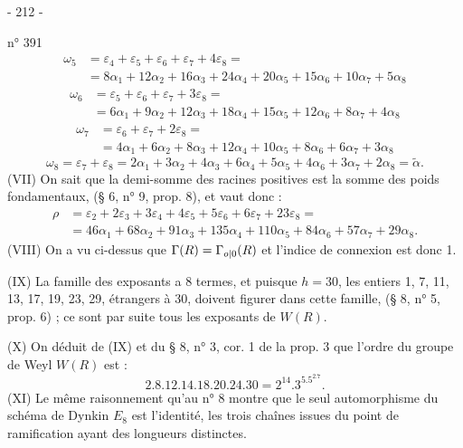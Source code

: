 \begin{center}- 212 -\end{center}
\hfill n° 391
\[
\begin{split}
\omega_5&=\varepsilon_4+\varepsilon_5+\varepsilon_6+\varepsilon_7+4\varepsilon_8=\\
&=8\alpha_1+12\alpha_2+16\alpha_3+24\alpha_4+20\alpha_5+15\alpha_6+10\alpha_7+5\alpha_8
\end{split}
\]
\[
\begin{split}
\omega_6&=\varepsilon_5+\varepsilon_6+\varepsilon_7+3\varepsilon_8=\\
&=6\alpha_1+9\alpha_2+12\alpha_3+18\alpha_4+15\alpha_5+12\alpha_6+8\alpha_7+4\alpha_8
\end{split}
\]
\[
\begin{split}
\omega_7&=\varepsilon_6+\varepsilon_7+2\varepsilon_8=\\
&=4\alpha_1+6\alpha_2+8\alpha_3+12\alpha_4+10\alpha_5+8\alpha_6+6\alpha_7+3\alpha_8
\end{split}
\]
\[
\omega_8=\varepsilon_7+\varepsilon_8=2\alpha_1+3\alpha_2+4\alpha_3+6\alpha_4+5\alpha_5+4\alpha_6+3\alpha_7+2\alpha_8=\widetilde\alpha.
\]
(VII) On sait que la demi-somme des racines positives est la somme des poids fondamentaux, (§ 6, n° 9, prop. 8), et vaut donc :
\[
\begin{split}
\rho&=\varepsilon_2+2\varepsilon_3+3\varepsilon_4+4\varepsilon_5+5\varepsilon_6+6\varepsilon_7+23\varepsilon_8=\\
&=46\alpha_1+68\alpha_2+91\alpha_3+135\alpha_4+110\alpha_5+84\alpha_6+57\alpha_7+29\alpha_8.
\end{split}
\]
(VIII) On a vu ci-dessus que $\Gamma(R)=\Gamma_{\relax{o|0}}(R)$ et l'indice de connexion est donc 1.

(IX) La famille des exposants a 8 termes, et puisque $h=30$, les entiers 1, 7, 11, 13, 17, 19, 23, 29, étrangers à 30, doivent figurer dans cette famille, (§ 8, n° 5, prop. 6) ; ce sont par suite tous les exposants de $W(R)$.

(X) On déduit de (IX) et du § 8, n° 3, cor. 1 de la prop. 3 que l'ordre du groupe de Weyl $W(R)$ est :
\[
2.8.12.14.18.20.24.30=2^{14}.3^5.5^2.7.
\]
(XI) Le même raisonnement qu'au n° 8 montre que le seul automorphisme du schéma de Dynkin $E_8$ est l'identité, les trois chaînes issues du point de ramification ayant des longueurs distinctes.
